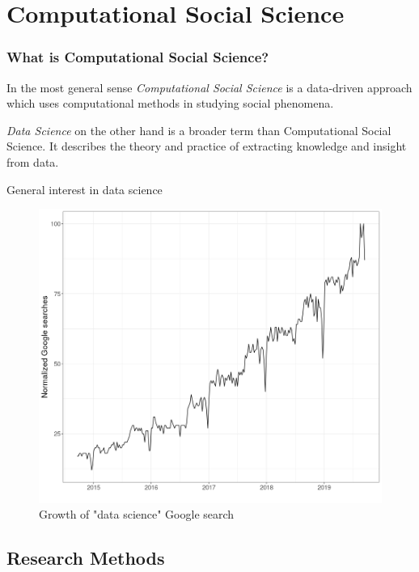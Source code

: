 \documentclass{beamer}
\begin{document}
\section[CSS]{Computational Social Science}

\begin{frame}
    \frametitle{What is Computational Social Science?}
    \begin{definition}{}
        In the most general sense \emph{Computational Social Science} is a data-driven approach which uses computational methods in studying social phenomena.
    \end{definition}
    \begin{definition}{}
        \emph{Data Science} on the other hand is a broader term than Computational Social Science. It describes the theory and practice of extracting knowledge and insight from data.
    \end{definition}
\end{frame}

\begin{frame}{General interest in data science}
    \begin{figure}
    \includegraphics[width = .8\framewidth]{png/ds-searches.png}
    \caption{Growth of "data science" Google search}
    \end{figure}
\end{frame}

\subsection{Research Methods}
\end{document}

